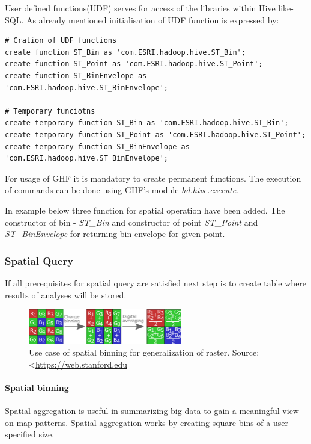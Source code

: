 \documentclass[a4paper,12pt,oneside]{report}
\begin{document}
	User defined functions(UDF) serves for access of the libraries within Hive like-SQL.
	As already mentioned initialisation of UDF function is expressed by:
\begin{footnotesize}
	\begin{lstlisting}[style=python]
# Cration of UDF functions
create function ST_Bin as 'com.ESRI.hadoop.hive.ST_Bin';
create function ST_Point as 'com.ESRI.hadoop.hive.ST_Point';
create function ST_BinEnvelope as 'com.ESRI.hadoop.hive.ST_BinEnvelope';

# Temporary funciotns 
create temporary function ST_Bin as 'com.ESRI.hadoop.hive.ST_Bin';
create temporary function ST_Point as 'com.ESRI.hadoop.hive.ST_Point';
create temporary function ST_BinEnvelope as 'com.ESRI.hadoop.hive.ST_BinEnvelope';
		\end{lstlisting}
	\end{footnotesize}
	For usage of GHF it is mandatory  to create permanent functions. The execution of
	commands can be done using GHF's module \textit{hd.hive.execute}.
	
	In example below three function for spatial operation have been added. The
	constructor of bin - \textit{ST\_Bin} and constructor of point
	\textit{ST\_Point} and \textit{ST\_BinEnvelope} for returning bin envelope for
	given point.

\subsubsection{Spatial Query}
		If all prerequisites for spatial query are satisfied next step is to create
	table where results of analyses will be stored. 
	

\begin{figure}[!htbp]
	\centering
	\includegraphics[width=0.6\textwidth]{./img/binning.png}
	\caption[Spatial binning]{\centering Use case of spatial binning for
	generalization of raster.
	Source: \textless\url{https://web.stanford.edu}}
	\label{map_cz}
\end{figure} 
\paragraph{Spatial binning}
	 Spatial aggregation is  useful in summarizing big data to gain a meaningful
	view on map patterns. Spatial aggregation works by creating square bins of a
	user specified size.
\end{document}
